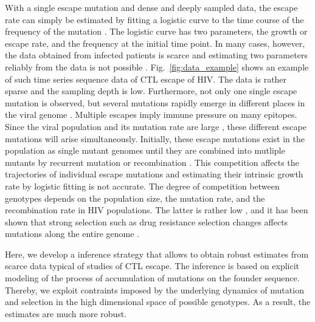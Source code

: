 \documentclass[rmp,twocolumn]{revtex4}
\newcommand{\FIG}[1]{Fig.~\ref{fig:#1}}
\begin{document}
With a single escape mutation and dense and deeply sampled data, the escape rate
can simply be estimated by fitting a logistic curve to the time course of the
frequency of the mutation \citep{Asquith:2006p28003,Ganusov:2011p43139}. The
logistic curve has two parameters, the growth or escape rate, and the frequency
at the initial time point. In many cases, however, the data obtained from
infected patients is scarce and estimating two parameters reliably from the data
is not possible \citep{Ganusov:2011p43139}. \FIG{data_example} shows an example
of such time series sequence data of CTL escape of HIV. The data is rather
sparse and the sampling depth is low. Furthermore, not only one single escape mutation is observed, but
several mutations rapidly emerge in different places in the viral genome
\citep{Goonetilleke:2009p42296,SalazarGonzalez:2009p35091}. Multiple escapes
imply immune pressure on many epitopes. Since the viral population and its
mutation rate are large \citep{Perelson:1996p23158,Mansky:1995p38971}, these
different escape mutations will arise simultaneously. Initially, these escape
mutations exist in the population as single mutant genomes until they are
combined into mutliple mutants by recurrent mutation or recombination
\citep{ganusov_mathematical_2013}. This competition affects the trajectories of
individual escape mutations and estimating their intrinsic growth rate by
logistic fitting is not accurate. The degree of competition between genotypes
depends on the population size, the mutation rate, and the recombination rate in
HIV populations. The latter is rather low
\citep{Neher:2010p32691,Batorsky:2011p40107}, and it has been shown that
strong selection such as drug resistance selection changes affects mutations
along the entire genome \citep{Nijhuis:1998p44376}.

Here, we develop a inference strategy that allows to obtain robust estimates
from scarce data typical of studies of CTL escape. The inference is based on
explicit modeling of the process of accumulation of mutations on the founder
sequence. Thereby, we exploit contraints imposed by the underlying dynamics of
mutation and selection in the high dimensional space of possible genotypes. As a
result, the estimates are much more robust. 
\end{document}
